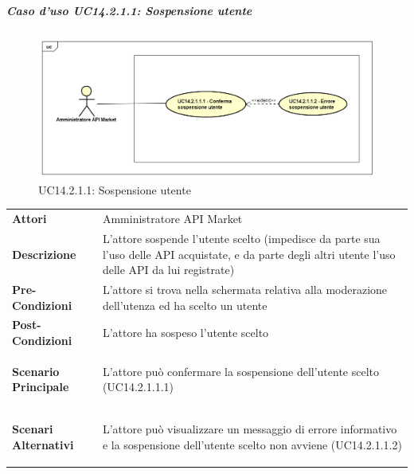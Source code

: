 \newpage
\subparagraph{Caso d'uso UC14.2.1.1: Sospensione utente}
\label{UC14_2_1_1}
\begin{figure}[ht]
	\centering
	\includegraphics[scale=0.45]{UML/UC14_2_1_1.png}
	\caption{UC14.2.1.1: Sospensione utente}
\end{figure}

\begin{minipage}{\linewidth}
	\begin{tabular}{ l | p{11cm}}
		\hline
		\rowcolor{Gray}
		\multicolumn{2}{c}{UC14.2.1.1 - Sospensione utente} \\
		\hline
		\textbf{Attori} & Amministratore API Market \\
		\textbf{Descrizione} & L'attore sospende l'utente scelto (impedisce da parte sua l'uso delle API acquistate, e da parte degli altri utente l'uso delle API da lui registrate) \\
		\textbf{Pre-Condizioni} & L'attore si trova nella schermata relativa alla moderazione dell'utenza ed ha scelto un utente \\
		\textbf{Post-Condizioni} & L'attore ha sospeso l'utente scelto \\
		\textbf{Scenario Principale} & 
		\begin{enumerate*}[label=(\arabic*.),itemjoin={\newline}]
			\item L'attore può confermare la sospensione dell'utente scelto (UC14.2.1.1.1)
		\end{enumerate*}\\
		\textbf{Scenari Alternativi} & 
		\begin{enumerate*}[label=(\arabic*.),itemjoin={\newline}]
			\item L'attore può visualizzare un messaggio di errore informativo e la sospensione dell'utente scelto non avviene (UC14.2.1.1.2)
		\end{enumerate*}\\
	\end{tabular}
\end{minipage}

